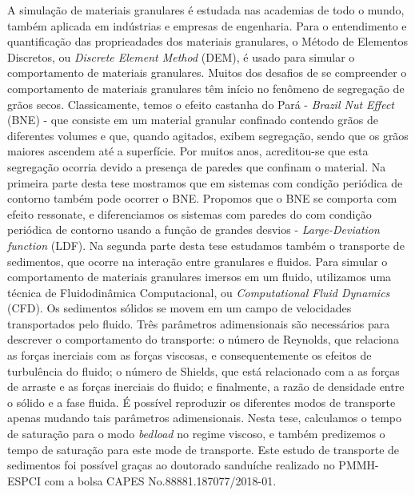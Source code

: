 
\begin{resumo}
    A simulação de materiais granulares é estudada nas academias de todo o mundo, também aplicada em indústrias e empresas de engenharia. Para o entendimento e quantificação das proprieadades dos materiais granulares, o Método de Elementos Discretos, ou \textit{Discrete Element Method} (DEM), é usado para simular o comportamento de materiais granulares.
    Muitos dos desafios de se compreender o comportamento de materiais granulares têm início no fenômeno de segregação de grãos secos. Classicamente, temos o efeito castanha do Pará - \textit{Brazil Nut Effect} (BNE) - que consiste em um material granular confinado contendo grãos de diferentes volumes e que, quando agitados, exibem segregação, sendo que os grãos maiores ascendem até a superfície. Por muitos anos, acreditou-se que esta segregação ocorria devido a presença de paredes que confinam o material. Na primeira parte desta tese mostramos que em sistemas com condição periódica de contorno também pode ocorrer o BNE. Propomos que o BNE se comporta com efeito ressonate, e diferenciamos os sistemas com paredes do com condição periódica de contorno usando a função de grandes desvios - \textit{Large-Deviation function} (LDF).
    Na segunda parte desta tese estudamos também o transporte de sedimentos, que ocorre na interação entre granulares e fluidos. Para simular o comportamento de materiais granulares imersos em um fluido, utilizamos uma técnica de Fluidodinâmica Computacional, ou \textit{Computational Fluid Dynamics} (CFD). Os sedimentos sólidos se movem em um campo de velocidades transportados pelo fluido. Três parâmetros adimensionais são necessários para descrever o comportamento do transporte: o número de Reynolds, que relaciona as forças inerciais com as forças viscosas, e consequentemente os efeitos de turbulência do fluido; o número de Shields, que está relacionado com a as forças de arraste e as forças inerciais do fluido; e finalmente, a razão de densidade entre o sólido e a fase fluida. É possível reproduzir os diferentes modos de transporte apenas mudando tais parâmetros adimensionais. Nesta tese, calculamos o tempo de saturação para o modo \textit{bedload} no regime viscoso, e também predizemos o tempo de saturação para este mode de transporte. Este estudo de transporte de sedimentos foi possível graças ao doutorado sanduíche realizado no PMMH-ESPCI com a bolsa CAPES No.88881.187077/2018-01.


\end{resumo}
